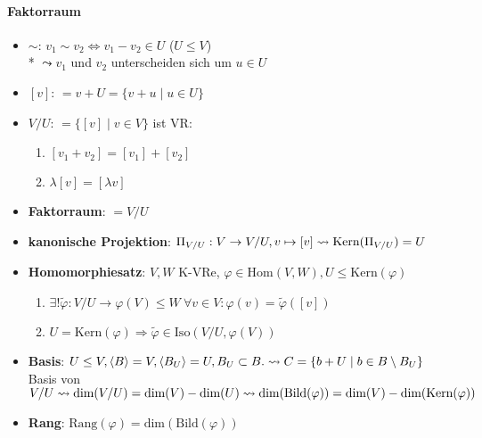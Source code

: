 \paragraph{Faktorraum}
\begin{itemize}
	\item \textbf{$\sim$}: $v_1 \sim v_2 \Leftrightarrow v_1 - v_2 \in U$ ($U \leq V$) \\* $\leadsto v_1$ und $v_2$ unterscheiden sich um $u \in U$
	\item \textbf{$[v]$}: $=v+U= \{ v+u \mid u \in U \}$
	\item \textbf{$V/U$}: $=\{ [v] \mid v \in V \}$ ist VR:
	\begin{enumerate}
		\item $[v_1+v_2]=[v_1]+[v_2]$
		\item $\lambda [v] = [\lambda v]$
	\end{enumerate}
	\item \textbf{Faktorraum}: $=V/U$
	\item \textbf{kanonische Projektion}: $\Pi_{V/U}: V \rightarrow V/U, v \mapsto [v] \\* \leadsto \text{Kern}(\Pi_{V/U})=U$
	\item \textbf{Homomorphiesatz}: $V,W$ K-VRe, $\varphi \in \text{Hom}(V,W), U \leq \text{Kern}(\varphi)$
	\begin{enumerate}
		\item $\exists ! \tilde{\varphi}: V/U \rightarrow \varphi(V) \leq W \ \forall v \in V: \varphi(v)= \tilde{\varphi}([v])$
		\item $U=\text{Kern}(\varphi) \Rightarrow \tilde{\varphi} \in \text{Iso}(V/U, \varphi(V))$
	\end{enumerate}
	\item \textbf{Basis}: $U \leq V, \langle B \rangle = V, \langle B_U \rangle = U, B_U \subset B. \\* \leadsto C=\{ b+U \mid b \in B \setminus B_U \}$ Basis von $V/U \\* \leadsto \text{dim}(V/U) = \text{dim}(V)-\text{dim}(U) \\* \leadsto \text{dim}(\text{Bild}(\varphi)) = \text{dim}(V)-\text{dim}(\text{Kern}(\varphi))$
	\item \textbf{Rang}: $\text{Rang}(\varphi)=\text{dim}(\text{Bild}(\varphi))$
\end{itemize}